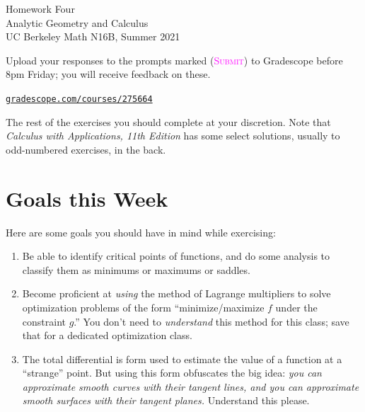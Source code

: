 

\usepackage{fourier}



\pagestyle{empty}




\begin{center}
    {\Huge{Homework Four}}
    \\ \footnotesize{Analytic Geometry and Calculus}
    \\ \footnotesize{UC Berkeley Math N16B, Summer 2021}
\end{center}
\vspace{2em}

Upload your responses to the prompts marked
(\textsc{\textcolor{magenta}{Submit}})
to Gradescope before 8pm Friday; 
you will receive feedback on these.
\begin{center}
    \href{https://www.gradescope.com/courses/275664}%
    {\texttt{gradescope.com/courses/275664}}
\end{center}
The rest of the exercises you should complete at your discretion.
Note that \emph{Calculus with Applications, 11th Edition} 
has some select solutions, usually to odd-numbered exercises, in the back.


\section*{Goals this Week}

Here are some goals you should have in mind while exercising:
\begin{enumerate}
    \item 
        Be able to identify critical points of functions,
        and do some analysis to classify them
        as minimums or maximums or saddles.
    \item 
        Become proficient at \emph{using} the method of Lagrange multipliers
        to solve optimization problems of the form ``minimize/maximize $f$
        under the constraint $g$.'' 
        You don't need to \emph{understand} this method for this class; 
        save that for a dedicated optimization class.
    \item 
        The total differential is form used to estimate
        the value of a function at a ``strange'' point. 
        But using this form obfuscates the big idea:
        \emph{you can approximate smooth curves with their tangent lines,
        and you can approximate smooth surfaces with their tangent planes.}
        Understand this please.
\end{enumerate}

